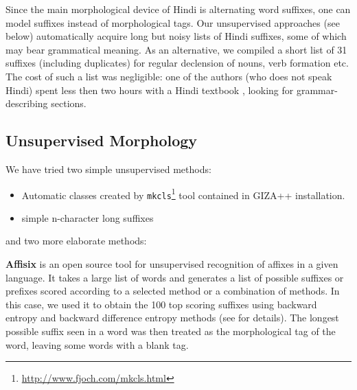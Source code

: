 \documentclass[11pt]{article}
\def\Sref#1{Section~\ref{#1}}
\begin{document}


\label{sec:textbook}
Since the main morphological device of Hindi is alternating word suffixes,
one can model suffixes instead of morphological tags.
Our unsupervised approaches (see below) automatically acquire long but noisy
lists of Hindi suffixes, some of which may bear grammatical meaning.
As an alternative, we compiled a short list of 31 suffixes (including
duplicates) for regular declension of nouns, verb formation etc.
The cost of such a list was negligible: one of the authors (who does not speak
Hindi) spent less then two hours with a Hindi textbook
\citep{teach_yourself_hindi}, looking for grammar-describing sections.

\subsection{Unsupervised Morphology} 
We have tried two simple unsupervised methods:
\begin{itemize}
\item Automatic classes created by \texttt{mkcls}\footnote{\url{http://www.fjoch.com/mkcls.html}} tool contained in GIZA++ installation. 
\item simple n-character long suffixes
\end{itemize}
and two more elaborate methods:

\label{sec:aff}
{\bf Affisix} is an open source tool for unsupervised recognition of affixes in a
given language. It takes a large list of words and generates a list
of possible suffixes or prefixes scored according to a selected method or a
combination of methods. In this case, we used it to obtain the 100 top scoring
suffixes
using backward entropy and backward difference entropy methods (see
\cite{affisixtsd2008} for details). The longest possible suffix seen in a word
was then treated as the morphological tag of the word, leaving some words with a
blank tag.
\end{document}
